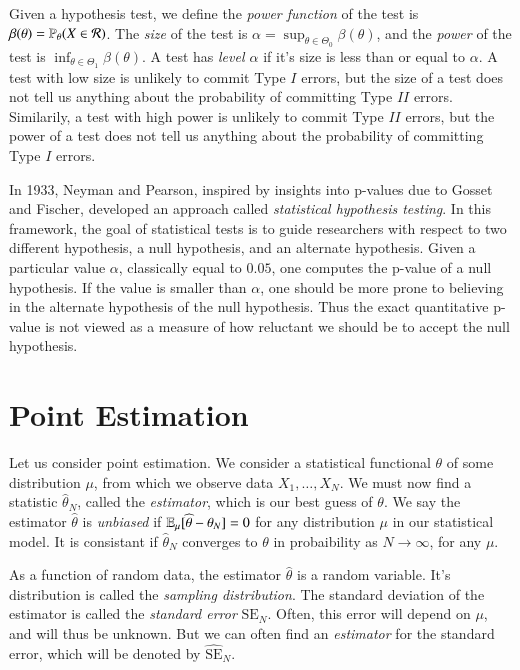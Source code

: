 Given a hypothesis test, we define the \emph{power function} of the test is $\beta(\theta) = \operatorname{\mathbb{P}}_\theta(X \in \mathcal{R})$. The \emph{size} of the test is $\alpha = \sup_{\theta \in \Theta_0} \beta(\theta)$, and the \emph{power} of the test is $\inf_{\theta \in \Theta_1} \beta(\theta)$. A test has \emph{level $\alpha$} if it's size is less than or equal to $\alpha$. A test with low size is unlikely to commit Type $I$ errors, but the size of a test does not tell us anything about the probability of committing Type $II$ errors. Similarily, a test with high power is unlikely to commit Type $II$ errors, but the power of a test does not tell us anything about the probability of committing Type $I$ errors.



In 1933, Neyman and Pearson, inspired by insights into p-values due to Gosset and Fischer, developed an approach called \emph{statistical hypothesis testing}. In this framework, the goal of statistical tests is to guide researchers with respect to two different hypothesis, a null hypothesis, and an alternate hypothesis. Given a particular value $\alpha$, classically equal to $0.05$, one computes the p-value of a null hypothesis. If the value is smaller than $\alpha$, one should be more prone to believing in the alternate hypothesis of the null hypothesis. Thus the exact quantitative p-value is not viewed as a measure of how reluctant we should be to accept the null hypothesis.









\chapter{Point Estimation}

Let us consider point estimation. We consider a statistical functional $\theta$ of some distribution $\mu$, from which we observe data $X_1,\dots,X_N$. We must now find a statistic $\widehat{\theta}_N$, called the \emph{estimator}, which is our best guess of $\theta$. We say the estimator $\widehat{\theta}$ is \emph{unbiased} if $\operatorname{\mathbb{E}}_\mu[\widehat{\theta} - \theta_N] = 0$ for any distribution $\mu$ in our statistical model. It is consistant if $\widehat{\theta}_N$ converges to $\theta$ in probaibility as $N \to \infty$, for any $\mu$.

As a function of random data, the estimator $\widehat{\theta}$ is a random variable. It's distribution is called the \emph{sampling distribution}. The standard deviation of the estimator is called the \emph{standard error} $\text{SE}_N$. Often, this error will depend on $\mu$, and will thus be unknown. But we can often find an \emph{estimator} for the standard error, which will be denoted by $\widehat{\text{SE}}_N$.


